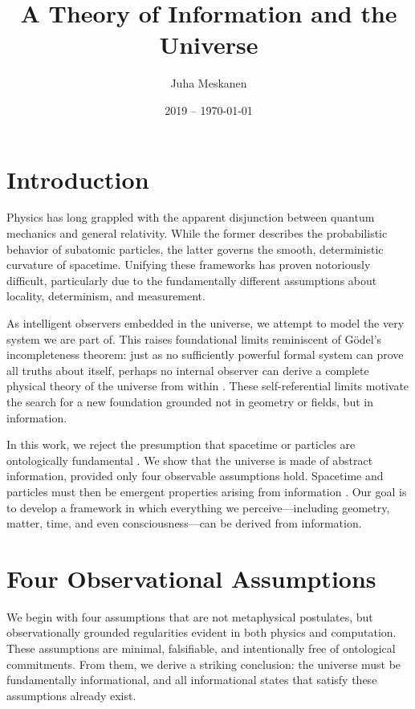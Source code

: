 \documentclass[11pt]{article}
\title{\LARGE A Theory of Information and the Universe}
\author{Juha Meskanen}
\date{2019 -- \today}
\begin{document}
\maketitle

\section{Introduction}

Physics has long grappled with the apparent disjunction between quantum mechanics and general relativity. While the former describes the probabilistic behavior of subatomic particles, the latter governs the smooth, deterministic curvature of spacetime. Unifying these frameworks has proven notoriously difficult, particularly due to the fundamentally different assumptions about locality, determinism, and measurement.

As intelligent observers embedded in the universe, we attempt to model the very system we are part of. This raises foundational limits reminiscent of Gödel's incompleteness theorem: just as no sufficiently powerful formal system can prove all truths about itself, perhaps no internal observer can derive a complete physical theory of the universe from within \cite{dyson2004godel}. These self-referential limits motivate the search for a new foundation grounded not in geometry or fields, but in information.

In this work, we reject the presumption that spacetime or particles are ontologically fundamental \cite{wheeler1990it} . We show that the universe is made of abstract information, provided only four observable assumptions hold. Spacetime and particles must then be emergent properties arising from information \cite{zuse1970calculating} \cite{tegmark2008mathematical}. Our goal is to develop a framework in which everything we perceive—including geometry, matter, time, and even consciousness—can be derived from information.

\section{Four Observational Assumptions}

We begin with four assumptions that are not metaphysical postulates, but observationally grounded regularities evident in both physics and computation. These assumptions are minimal, falsifiable, and intentionally free of ontological commitments. From them, we derive a striking conclusion: the universe must be fundamentally informational, and all informational states that satisfy these assumptions already exist.
\end{document}
